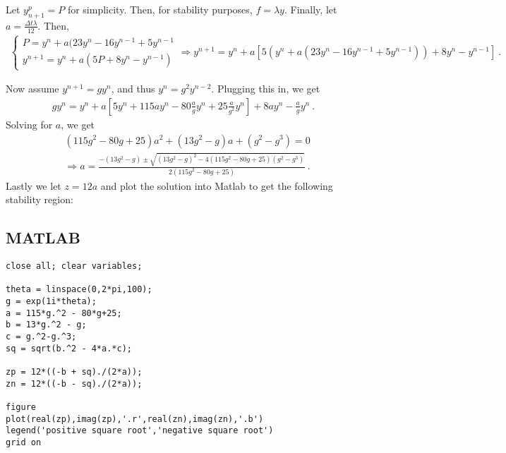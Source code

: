 \begin{questions}

\begin{solution}

Let $y_{n+1}^p = P$ for simplicity. Then, for stability purposes, $f = \lambda y$. Finally, let $a = \frac{\Delta t \lambda}{12}$. Then,
\begin{align*}
\begin{cases}
P = y^n + a(23y^n - 16y^{n-1}+5y^{n-1} \\
y^{n+1} = y^n + a(5P + 8y^n - y^{n-1})
\end{cases} \Rightarrow y^{n+1} = y^n + a \left[ 5(y^n + a(23y^n- 16y^{n-1}+5y^{n-1})) + 8y^n - y^{n-1} \right]~.
\end{align*} 

Now assume $y^{n+1} = gy^n$, and thus $y^n = g^2y^{n-2}$. Plugging this in, we get
\begin{align*}
gy^n = y^n +a\left[ 5y^n + 115ay^n - 80\frac{a}{g}y^n + 25\frac{a}{g^2}y^n\right] + 8ay^n - \frac{a}{g}y^n~.
\end{align*}
Solving for $a$, we get
\begin{align*}
&(115g^2 - 80g +25)a^2 + (13g^2-g)a + (g^2-g^3) = 0 \\
& \Rightarrow a = \frac{-(13g^2 - g) \pm \sqrt{(13g^2-g)^2 - 4(115g^2 - 80g+25)(g^2-g^3)}}{2(115g^2 - 80g +25)}~.
\end{align*}
Lastly we let $z = 12a$ and plot the solution into Matlab to get the following stability region:

\begin{figure}[H]
\end{figure}


\end{solution}

\subsection*{MATLAB}

\begin{verbatim}
close all; clear variables;

theta = linspace(0,2*pi,100);
g = exp(1i*theta);
a = 115*g.^2 - 80*g+25;
b = 13*g.^2 - g;
c = g.^2-g.^3;
sq = sqrt(b.^2 - 4*a.*c);

zp = 12*((-b + sq)./(2*a));
zn = 12*((-b - sq)./(2*a));

figure
plot(real(zp),imag(zp),'.r',real(zn),imag(zn),'.b')
legend('positive square root','negative square root')
grid on
\end{verbatim}


\end{questions}